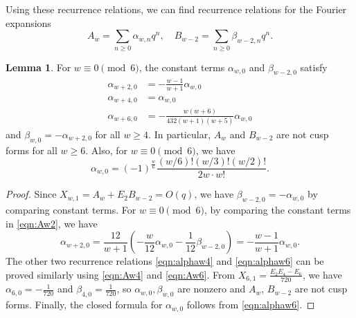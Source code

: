 \documentclass[10pt,reqno]{amsproc}
\newcommand{\1}{\mathds{1}}	%
\theoremstyle{definition}
\newtheorem{lemma}[theorem]{Lemma}
\theoremstyle{remark}
\begin{document}
Using these recurrence relations, we can find recurrence relations for the Fourier expansions
\begin{equation}
    A_w = \sum_{n \ge 0} \alpha_{w,n} q^n, \quad B_{w-2} = \sum_{n \ge 0} \beta_{w-2,n} q^n. \label{eqn:AwBwm2fourier}
\end{equation}

\begin{lemma}
    \label{lem:n0coeff}
    For $w \equiv 0 \pmod{6}$, the constant terms $\alpha_{w,0}$ and $\beta_{w-2,0}$ satisfy
    \begin{align}
        \alpha_{w+2,0} &= -\frac{w-1}{w+1} \alpha_{w,0} \label{eqn:alphaw2} \\
        \alpha_{w+4,0} &= \alpha_{w,0} \label{eqn:alphaw4} \\
        \alpha_{w+6,0} &= -\frac{w(w+6)}{432(w+1)(w+5)} \alpha_{w,0} \label{eqn:alphaw6}
    \end{align}
    and $\beta_{w,0} = -\alpha_{w+2,0}$ for all $w \ge 4$.
    In particular, $A_{w}$ and $B_{w-2}$ are not cusp forms for all $w \ge 6$.
    Also, for $w \equiv 0 \pmod{6}$, we have
    \begin{equation}
        \label{eqn:alphawclosed}
        \alpha_{w,0} = (-1)^{\frac{w}{6}}\frac{(w/6)! (w/3)! (w/2)! }{2w \cdot w!}.
    \end{equation}
\end{lemma}
\begin{proof}
    Since $X_{w, 1} = A_w + E_2 B_{w-2} = O(q)$, we have $\beta_{w-2,0} = -\alpha_{w,0}$ by comparing constant terms.
    For $w \equiv 0 \pmod{6}$, by comparing the constant terms in \eqref{eqn:Aw2}, we have
    \[
        \alpha_{w+2,0} = \frac{12}{w+1} \left(-\frac{w}{12} \alpha_{w,0} - \frac{1}{12} \beta_{w-2,0}\right) = -\frac{w-1}{w+1} \alpha_{w,0}.
    \]
    The other two recurrence relations \eqref{eqn:alphaw4} and \eqref{eqn:alphaw6} can be proved similarly using \eqref{eqn:Aw4} and \eqref{eqn:Aw6}.
    From $X_{6, 1} = \frac{E_2 E_4 - E_6}{720}$, we have $\alpha_{6,0} = -\frac{1}{720}$ and $\beta_{4,0} = \frac{1}{720}$, so $\alpha_{w,0}, \beta_{w,0}$ are nonzero and $A_w$, $B_{w-2}$ are not cusp forms.
    Finally, the closed formula for $\alpha_{w,0}$ follows from \eqref{eqn:alphaw6}.
\end{proof}
\end{document}
